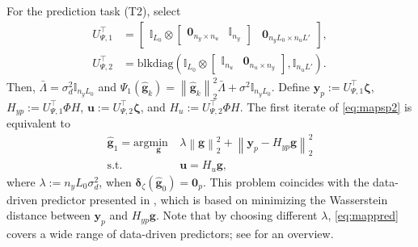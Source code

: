 \documentclass{ifacconf}
\newcommand{\norm}[1]{\left\lVert#1\right\rVert}
\newcommand{\blkdiag}[1]{\mathrm{blkdiag}\left(#1\right)}
\begin{document}
For the prediction task (T2), select
\begin{align*}
    U_{\Psi,1}^\top&=\begin{bmatrix}
    \mathbb{I}_{L_0}\otimes\begin{bmatrix}
        \mathbf{0}_{n_y\times n_u}&\mathbb{I}_{n_y}
    \end{bmatrix}&\mathbf{0}_{n_yL_0\times n_uL'}
\end{bmatrix},\\U_{\Psi,2}^\top&=\blkdiag{\mathbb{I}_{L_0}\otimes\begin{bmatrix}
        \mathbb{I}_{n_u}&\mathbf{0}_{n_u\times n_y}
    \end{bmatrix},\mathbb{I}_{n_uL'}}.
\end{align*}
Then, $\bar{\Lambda}=\sigma_d^2\mathbb{I}_{n_yL_0}$ and $\Psi_1(\hat{\mathbf{g}}_k)=\norm{\hat{\mathbf{g}}_k}_2^2\bar{\Lambda}+\sigma^2\mathbb{I}_{n_yL_0}$.
Define $\mathbf{y}_p:=U_{\Psi,1}^\top\boldsymbol{\zeta}$, $H_{yp}:=U_{\Psi,1}^\top\Phi H$, $\mathbf{u}:=U_{\Psi,2}^\top\boldsymbol{\zeta}$, and $H_u:=U_{\Psi,2}^\top\Phi H$. The first iterate of \eqref{eq:mapsp2} is equivalent to
\begin{equation}
    \begin{aligned}
        \hat{\mathbf{g}}_1=\mathrm{arg}\underset{\mathbf{g}}{\mathrm{min}}&\ \lambda\norm{\mathbf{g}}_2^2+\norm{\mathbf{y}_p-H_{yp}\mathbf{g}}_2^2\\
        \mathrm{s.t.}&\ \mathbf{u}=H_u\mathbf{g},
    \end{aligned}
    \label{eq:mappred}
\end{equation}
where $\lambda:=n_yL_0\sigma_d^2$, when $\boldsymbol{\delta}_\zeta(\hat{\mathbf{g}}_0)=\mathbf{0}_p$. This problem coincides with the data-driven predictor presented in \cite{lian2021adaptive}, which is based on minimizing the Wasserstein distance between $\mathbf{y}_p$ and $H_{yp}\mathbf{g}$. Note that by choosing different $\lambda$, \eqref{eq:mappred} covers a wide range of data-driven predictors; see \cite{yin2021data} for an overview.
\end{document}
